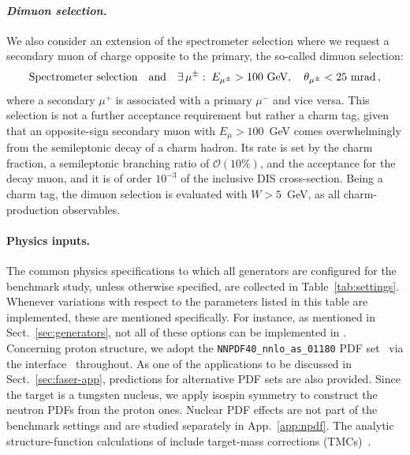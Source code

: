 \paragraph{\it Dimuon selection.} 
%
We also consider an extension of the spectrometer selection where we request a secondary  muon of charge opposite to the primary, the so-called dimuon selection:
\begin{equation}
  \textrm{Spectrometer~selection} \quad \textrm{and} \quad \exists\, \mu^{\pm} :\;
  E_{\mu^{\pm}} > 100~{\rm GeV} , \quad \theta_{\mu^{\pm}} < 25~{\rm mrad} \, ,
  \label{eq:tierD}
\end{equation}
where a secondary $\mu^+$ is associated with a primary $\mu^-$ and vice versa.
%
This selection is not a further acceptance requirement but rather a charm tag, given that an
opposite-sign secondary muon with $E_\mu > 100$~GeV comes overwhelmingly from the
semileptonic decay of a charm hadron.
%
Its rate is set by the charm fraction, a semileptonic branching ratio of $\mathcal{O}(10\%)$, and the acceptance for the decay muon, and it is of order $10^{-3}$ of the inclusive DIS cross-section.
%
Being a charm tag, the dimuon selection is evaluated with $W > 5$~GeV, as all charm-production observables. 

\paragraph{Physics inputs.}

The common physics specifications to which all generators are configured for the benchmark study, unless otherwise specified, are collected in Table~\ref{tab:settings}.
%
Whenever variations with respect to the parameters listed in this table are implemented, these are mentioned specifically.
%
For instance, as mentioned in 
Sect.~\ref{sec:generators}, not all of these options can be implemented in \genie.
%
Concerning proton structure, we adopt the {\tt NNPDF40\_nnlo\_as\_01180} PDF set~\cite{NNPDF:2021njg} via the \lhapdf interface~\cite{Buckley:2014ana} throughout. 
%
As one of the applications to be discussed in Sect.~\ref{sec:faser-app}, predictions for alternative PDF sets are also provided. 
%
Since the target is a tungsten nucleus, we apply isospin symmetry to construct the neutron PDFs from the proton ones. 
%
Nuclear PDF effects are not part of the benchmark settings and are studied separately in App.~\ref{app:npdf}.
%
The analytic structure-function calculations  of \yadism include target-mass corrections (TMCs)~\cite{Schienbein:2007gr}.

